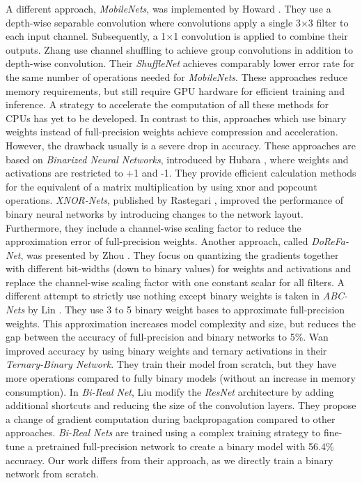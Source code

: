 \documentclass[10pt,twocolumn,letterpaper]{article}
\newcommand{\architecture}[1]{\emph{#1}}
\newcommand{\arch}[1]{\emph{#1}}
\begin{document}
A different approach, \emph{MobileNets}, was implemented by Howard \etal\cite{Howard2017}.
They use a depth-wise separable convolution where convolutions apply a single 3$\times$3 filter to each input channel.
Subsequently, a 1$\times$1 convolution is applied to combine their outputs.
Zhang \etal\cite{Zhang2017} use channel shuffling to achieve group convolutions in addition to depth-wise convolution.
Their \emph{ShuffleNet} achieves comparably lower error rate for the same number of operations needed for \emph{MobileNets}.
These approaches reduce memory requirements, but still require GPU hardware for efficient training and inference.
A strategy to accelerate the computation of all these methods for CPUs has yet to be developed.
In contrast to this, approaches which use binary weights instead of full-precision weights achieve compression and acceleration.
However, the drawback usually is a severe drop in accuracy.
These approaches are based on \emph{Binarized Neural Networks}, introduced by Hubara \etal\cite{Courbariaux2016}, where weights and activations are restricted to +1 and -1.
They provide efficient calculation methods for the equivalent of a matrix multiplication by using $\mathrm{xnor}$ and $\mathrm{popcount}$ operations.
\emph{XNOR-Nets}, published by Rastegari \etal\cite{Rastegari2016}, improved the performance of binary neural networks by introducing changes to the network layout.
Furthermore, they include a channel-wise scaling factor to reduce the approximation error of full-precision weights.
Another approach, called \emph{DoReFa-Net}, was presented by Zhou \etal\cite{Zhou2016}.
They focus on quantizing the gradients together with different bit-widths (down to binary values) for weights and activations and replace the channel-wise scaling factor with one constant scalar for all filters.
A different attempt to strictly use nothing except binary weights is taken in \emph{ABC-Nets} by Lin \etal\cite{lin2017towards}.
They use 3 to 5 binary weight bases to approximate full-precision weights.
This approximation increases model complexity and size, but reduces the gap between the accuracy of full-precision and binary networks to 5\%.
Wan \etal\cite{Wan_2018_ECCV} improved accuracy by using binary weights and ternary activations in their \emph{Ternary-Binary Network}.
They train their model from scratch, but they have more operations compared to fully binary models (without an increase in memory consumption).
In \emph{Bi-Real Net}, Liu \etal\cite{Liu_2018_ECCV} modify the \arch{ResNet} architecture by adding additional shortcuts and reducing the size of the convolution layers.
They propose a change of gradient computation during backpropagation compared to other approaches.
\architecture{Bi-Real Nets} are trained using a complex training strategy to fine-tune a pretrained full-precision network to create a binary model with 56.4\% accuracy.
Our work differs from their approach, as we directly train a binary network from scratch.
\end{document}
